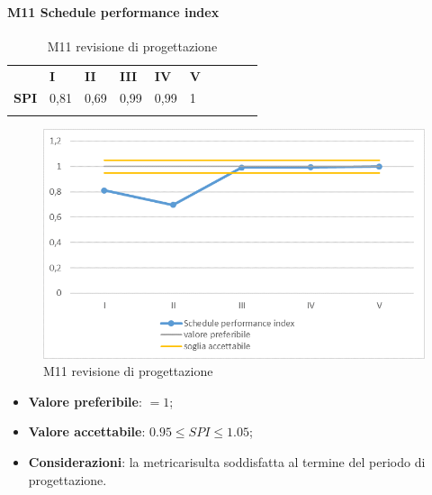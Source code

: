 \paragraph{M11 Schedule performance index} \mbox{}
\begin{longtable}[H!] {						
		>{}p{50mm}  		
		>{}p{8mm}
		>{}p{8mm}		
		>{}p{8mm}		
		>{}p{8mm}		
		>{}p{8mm}		
		>{}p{8mm}
		>{}p{8mm}
		>{}p{8mm}
		>{}p{8mm}
	}
	\rowcolor{gray!50}
	\textbf{} & \textbf{I} & \textbf{II} & \textbf{III} & \textbf{IV} & \textbf{V} \TBstrut \\ [2mm]
	\textbf{SPI} & 0,81 & 0,69 & 0,99 & 0,99 & 1 \TBstrut \\ [2mm]
	\rowcolor{white}
	\caption{M11 revisione di progettazione\glo}
\end{longtable}
\begin{figure}[H] 	
\includegraphics[width=\linewidth]{./img/grafici/RP8.png}	
\caption{M11 revisione di progettazione\glo}	
\end{figure}
\begin{itemize}
	\item \textbf{Valore preferibile}: $=1$;
	\item \textbf{Valore accettabile}: $0.95 \le SPI \le 1.05$;
	\item \textbf{Considerazioni}: la metrica\glosp risulta soddisfatta al termine del periodo di progettazione\glo.
\end{itemize}
